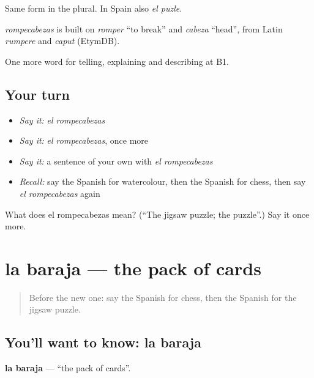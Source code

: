 Same form in the plural. In Spain also \emph{el puzle}.

\begin{cousinweb}
\emph{rompecabezas} is built on \emph{romper} \textquotedblleft{}to break\textquotedblright{} and \emph{cabeza} \textquotedblleft{}head\textquotedblright{}, from Latin \emph{rumpere} and \emph{caput} (EtymDB).
\end{cousinweb}

\begin{grammarlens}[title={What you've built}]
One more word for telling, explaining and describing at B1.
\end{grammarlens}

\subsection*{Your turn}
\begin{itemize}
\raggedright
  \item \emph{Say it:} \emph{el rompecabezas}
  \item \emph{Say it:} \emph{el rompecabezas}, once more
  \item \emph{Say it:} a sentence of your own with \emph{el rompecabezas}
  \item \emph{Recall:} say the Spanish for watercolour, then the Spanish for chess, then say \emph{el rompecabezas} again
\end{itemize}

\begin{tcolorbox}[breakable,colback=teal!4,colframe=teal!35!black,title={Before you move on}]
What does el rompecabezas mean? (\textquotedblleft{}The jigsaw puzzle; the puzzle\textquotedblright{}.) Say it once more.
\end{tcolorbox}
\section[la baraja]{la baraja — the pack of cards}

\label{lesson:ES-C752-baraja}



\begin{quote}
Before the new one: say the Spanish for chess, then the Spanish for the jigsaw puzzle.
\end{quote}

\subsection*{You'll want to know: la baraja}
\textbf{la baraja} — \textquotedblleft{}the pack of cards\textquotedblright{}.

